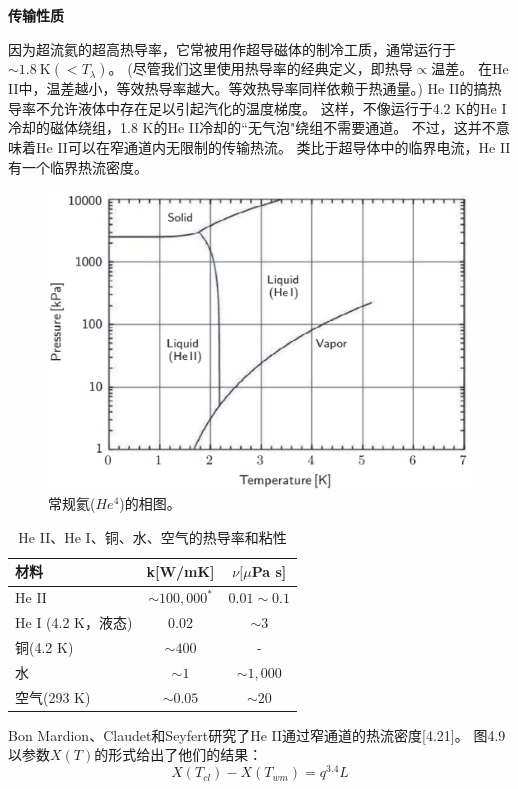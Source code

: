 \textbf{传输性质}

因为超流氦的超高热导率，它常被用作超导磁体的制冷工质，通常运行于$\sim 1.8\ \mathrm{K}(<T_\lambda)$。
(尽管我们这里使用热导率的经典定义，即热导$\propto$温差。
在He II中，温差越小，等效热导率越大。等效热导率同样依赖于热通量。)
He II的搞热导率不允许液体中存在足以引起汽化的温度梯度。
这样，不像运行于4.2 K的He I冷却的磁体绕组，1.8 K的He II冷却的``无气泡"绕组不需要通道。
不过，这并不意味着He II可以在窄通道内无限制的传输热流。
类比于超导体中的临界电流，He II有一个临界热流密度。

\begin{figure}[htbp]
	\centering
	\includegraphics[scale=0.5]{chpt4/figs/fig4.8.eps}
	\caption{常规氦($He^4$)的相图。}
\end{figure}

\begin{table}[htbp]\small
 \centering
\caption{He II、He I、铜、水、空气的热导率和粘性}
	\begin{tabular}{|l||c|c|}
\hline
材料& k[W/mK] & $\nu[\mu$Pa s] \\ \hline\hline
He II & $\sim100,000^*$ & $0.01\sim0.1$ \\ \hline
He I (4.2 K，液态) & 0.02 & $\sim3$ \\ \hline
铜(4.2 K) & $\sim400$ & - \\ \hline
水& $\sim1$ & $\sim1,000$ \\ \hline
空气(293 K) & $\sim0.05$ & $\sim20$ \\ \hline
\end{tabular}
\end{table}

Bon Mardion、Claudet和Seyfert研究了He II通过窄通道的热流密度[4.21]。
图4.9以参数$X(T)$的形式给出了他们的结果：
\begin{equation}%
X(T_{cl})-X(T_{wm})=q^{3.4}L
\end{equation}

